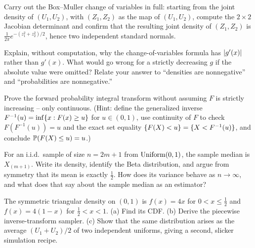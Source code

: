 \begin{exercise}
\label{ch16:ex-bm}
Carry out the Box--Muller change of variables in full: starting from the joint density of
$(U_1, U_2)$, with $(Z_1, Z_2)$ as the map of $(U_1, U_2)$, compute the $2\times2$ Jacobian determinant and
confirm that the resulting joint density of $(Z_1,Z_2)$ is
$\tfrac{1}{2\pi}e^{-(z_1^2+z_2^2)/2}$, hence two independent standard normals.
\end{exercise}

\begin{exercise}
\label{ch16:ex-absval}
Explain, without computation, why the change-of-variables formula has $\abs{g'(x)}$ rather
than $g'(x)$. What would go wrong for a strictly decreasing $g$ if the absolute value were
omitted? Relate your answer to ``densities are nonnegative'' and ``probabilities are
nonnegative.''
\end{exercise}

\begin{exercise}
\label{ch16:ex-pit-proof}
Prove the forward probability integral transform without assuming $F$ is strictly
increasing -- only continuous. (Hint: define the generalized inverse
$F^{-1}(u) = \inf\set{x : F(x)\ge u}$ for $u \in (0,1)$, use continuity of $F$ to check $F(F^{-1}(u)) = u$ and the exact set equality $\set{F(X) < u} = \set{X < F^{-1}(u)}$, and conclude $\P(F(X)\le u) = u$.)
\end{exercise}

\begin{exercise}
\label{ch16:ex-median}
For an i.i.d.\ sample of size $n = 2m+1$ from $\Unif(0,1)$, the sample median is
$X_{(m+1)}$. Write its density, identify the Beta distribution, and argue from symmetry
that its mean is exactly $\tfrac12$. How does its variance behave as $n \to \infty$, and
what does that say about the sample median as an estimator?
\end{exercise}

\begin{exercise}
\label{ch16:ex-triangular}
The symmetric triangular density on $(0,1)$ is $f(x) = 4x$ for $0<x\le\tfrac12$ and
$f(x)=4(1-x)$ for $\tfrac12<x<1$. (a) Find its CDF. (b) Derive the piecewise
inverse-transform sampler. (c) Show that the same distribution arises as the average
$(U_1+U_2)/2$ of two independent uniforms, giving a second, slicker simulation recipe.
\end{exercise}
